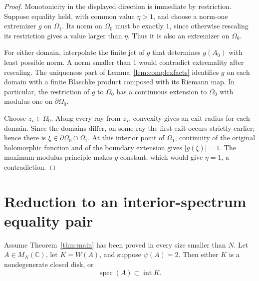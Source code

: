 \documentclass[preprints,article,submit,oneauthor]{Definitions/mdpi}
\numberwithin{equation}{section}
\newcommand{\C}{\mathbb C}
\newcommand{\spec}{\operatorname{spec}}
\newcommand{\Int}{\operatorname{int}}
\begin{document}
\begin{proof}
Monotonicity in the displayed direction is immediate by restriction.  Suppose
equality held, with common value \(\eta>1\), and choose a norm-one extremizer \(g\)
on \(\Omega_1\).  Its norm on \(\Omega_0\) must be exactly \(1\), since otherwise
rescaling its restriction gives a value larger than \(\eta\).  Thus it is also an
extremizer on \(\Omega_0\).

For either domain, interpolate the finite jet of \(g\) that determines \(g(A_0)\)
with least possible norm.  A norm smaller than \(1\) would contradict
extremality after rescaling.  The uniqueness part of
Lemma~\ref{lem:complexfacts} identifies \(g\) on each domain with a finite
Blaschke product composed with its Riemann map.  In particular, the restriction
of \(g\) to \(\Omega_0\) has a continuous extension to
\(\overline{\Omega_0}\) with modulus one on \(\partial\Omega_0\).

Choose \(z_\star\in\Omega_0\).  Along every ray from \(z_\star\), convexity gives an exit
radius for each domain.  Since the domains differ, on some ray the first exit
occurs strictly earlier; hence there is
\(\xi\in\partial\Omega_0\cap\Omega_1\).  At this interior point of \(\Omega_1\),
continuity of the original holomorphic function and of the boundary extension
gives \(|g(\xi)|=1\).  The maximum-modulus principle makes \(g\) constant,
which would give \(\eta=1\), a contradiction.
\end{proof}

\section{Reduction to an interior-spectrum equality pair}

\begin{Lemma}\label{lem:induction}
Assume Theorem~\ref{thm:main} has been proved in every size smaller than \(N\).
Let \(A\in M_N(\C)\), let \(K=W(A)\), and suppose \(\psi(A)=2\).  Then either
\(K\) is a nondegenerate closed disk, or
\[
 \spec(A)\subset\Int K.                               \tag{4.1}
\]
\end{Lemma}
\end{document}
